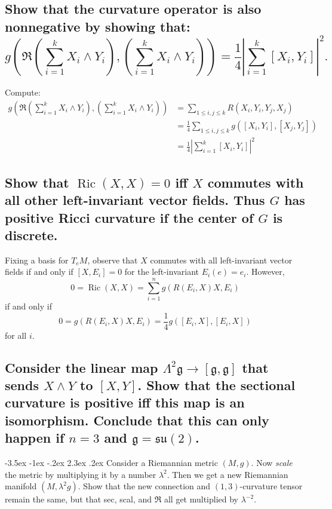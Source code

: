 \documentclass[10pt]{article}
\makeatletter
\renewcommand\section{\@startsection{section}{1}{\z@}%
                                  {-3.5ex \@plus -1ex \@minus -.2ex}%
                                  {2.3ex \@plus.2ex}%
                                  {\normalfont\large\bfseries}}
\DeclareMathOperator{\ric}{Ric}
\makeatother
\begin{document}
\subsection{Show that the curvature operator is also nonnegative by showing that: $$g \left( \mathfrak{R}\left( \sum_{i=1}^k X_i \wedge Y_i \right) , \left( \sum_{i=1}^k X_i \wedge Y_i \right) \right) = \frac{1}{4} \left| \sum_{i=1}^k [X_i, Y_i ] \right|^2 .$$}

Compute:
\begin{align*}
	g \left( \mathfrak{R}\left( \sum_{i=1}^k X_i \wedge Y_i \right) , \left( \sum_{i=1}^k X_i \wedge Y_i \right) \right) &= \sum_{1 \leq i,j \leq k} R(X_i, Y_i, Y_j, X_j)\\
	&= \frac{1}{4} \sum_{1 \leq i, j \leq k }   g\left( [X_i, Y_i] , [ X_j, Y_j]   \right)\\
	&= \frac{1}{4} \left| \sum_{i=1}^k [X_i, Y_i]  \right|^2
\end{align*}

\subsection{Show that $\ric(X,X) =0$ iff $X$ commutes with all other left-invariant vector fields. Thus $G$ has positive Ricci curvature if the center of $G$ is discrete.}
Fixing a basis for $T_e M$, observe that $X$ commutes with all left-invariant vector fields if and only if $[X,E_i] = 0$ for the left-invariant $E_i(e) = e_i$. However,
\[0 = \ric (X,X) = \sum_{i=1}^n g( R (E_i, X) X, E_i)\] 
if and only if 
\[ 0 = g(R(E_i, X) X , E_i) =  \frac{1}{4} g([E_i, X ] , [E_i, X] ) \]
for all $i$.

\subsection{Consider the linear map $\Lambda^2 \mathfrak{g} \to [\mathfrak{g} , \mathfrak{g}]$ that sends $X \wedge Y$ to $[X,Y]$. Show that the sectional curvature is positive iff this map is an isomorphism. Conclude that this can only happen if $n=3$ and $\mathfrak{g} = \mathfrak{su} (2)$.}


\section{Consider a Riemannian metric $(M,g)$. Now \emph{scale} the metric by multiplying it by a number $\lambda^2$. Then we get  a new Riemannian manifold $(M, \lambda^2 g)$. Show that the new connection and $(1,3)$-curvature tensor remain the same, but that sec, scal, and $\mathfrak{R}$ all get multiplied by $\lambda^{-2}$.}
\end{document}
